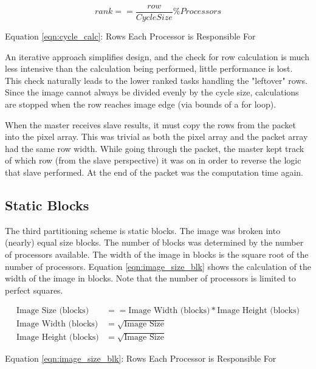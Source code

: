 \documentclass[11pt]{article}
\begin{document}
		\begin{equation}\label{eqn:cycle_calc}
		rank == \frac{row}{CycleSize} \% Processors
		\end{equation}
		\begin{center}
			Equation \ref{eqn:cycle_calc}: Rows Each Processor is Responsible For
		\end{center}
	
		An iterative approach simplifies design, and the check for row calculation is much less intensive than the calculation being performed, little performance is lost. This check naturally leads to the lower ranked tasks handling the "leftover" rows. Since the image cannot always be divided evenly by the cycle size, calculations are stopped when the row reaches image edge (via bounds of a for loop).
		
		When the master receives slave results, it must copy the rows from the packet into the pixel array. This was trivial as both the pixel array and the packet array had the same row width. While going through the packet, the master kept track of which row (from the slave perspective) it was on in order to reverse the logic that slave performed. At the end of the packet was the computation time again.
	
	\subsection{Static Blocks}
	
		The third partitioning scheme is static blocks. The image was broken into (nearly) equal size blocks. The number of blocks was determined by the number of processors available. The width of the image in blocks is the square root of the number of processors. Equation \ref{eqn:image_size_blk} shows the calculation of the width of the image in blocks. Note that the number of processors is limited to perfect squares.
		
		\begin{subequations}
		\begin{align}\label{eqn:image_size_blk}
			\text{Image Size (blocks)} & == \text{Image Width (blocks)} * \text{Image Height (blocks)}
			\\
			\text{Image Width (blocks)} & = \sqrt{\text{Image Size}}
			\\
			\text{Image Height (blocks)} & = \sqrt{\text{Image Size}}
		\end{align}
		\end{subequations}
		\begin{center}
			Equation \ref{eqn:image_size_blk}: Rows Each Processor is Responsible For
		\end{center}
	
\end{document}
